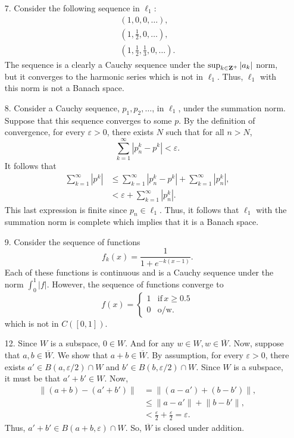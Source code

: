 \documentclass{article}
\newcommand{\eps}{\varepsilon}
\theoremstyle{remark}
\begin{document}
\thispagestyle{firstpage}
\begin{enumerate}[leftmargin=*]
    \item[7.] Consider the following sequence in $\ell_1$:
    \begin{gather*}
        \left(1,0,0,\ldots\right), \\
        \left(1,\frac{1}{2},0,\ldots\right), \\
        \left(1,\frac{1}{2},\frac{1}{3},0,\ldots\right).
    \end{gather*}
    The sequence is a clearly a Cauchy sequence under the $\sup_{k\in\mathbf{Z}^+}|a_k|$ norm, but it converges to the harmonic series which is not in $\ell_1$. Thus, $\ell_1$ with this norm is not a Banach space.
    \item[8.] Consider a Cauchy sequence, $p_1,p_2,\ldots$, in $\ell_1$, under the summation norm. Suppose that this sequence converges to some $p$. By the definition of convergence, for every $\eps > 0$, there exists $N$ such that for all $n > N$, \[
    \sum_{k=1}^\infty |p^k_n - p^k| < \eps.
    \]
    It follows that 
    \begin{align*}
        \sum_{k=1}^\infty |p^k| &\leq \sum_{k=1}^\infty |p^k_n - p^k| + \sum_{k=1}^\infty |p^k_n|, \\
        &< \eps + \sum_{k=1}^\infty |p^k_n|.
    \end{align*}
    This last expression is finite since $p_n \in \ell_1$. Thus, it follows that $\ell_1$ with the summation norm is complete which implies that it is a Banach space.
    \item[9.] Consider the sequence of functions \[
    f_k(x) = \frac{1}{1+e^{-k(x-1)}}.
    \]
    Each of these functions is continuous and is a Cauchy sequence under the norm $\int_0^1|f|$. However, the sequence of functions converge to 
    \[
        f(x) = \begin{cases}1 &\text{if}\,x\geq 0.5 \\ 0 &\text{o/w}.\end{cases}
    \]
    which is not in $C([0,1])$.
    \item[12.] Since $W$ is a subspace, $0 \in W$. And for any $w \in W, w \in \overline{W}$. Now, suppose that $a, b \in \overline{W}$. We show that $a + b \in \overline{W}$. By assumption, for every $\eps > 0$, there exists $a' \in B(a,\eps/2) \cap W$ and $b' \in B(b,\eps/2) \cap W$. Since $W$ is a subspace, it must be that $a' + b' \in W$. Now,
    \begin{align*}
        \lVert (a + b) - (a' + b') \rVert &= \lVert (a - a') + (b - b') \rVert, \\
        &\leq \lVert a - a'\rVert + \lVert b - b' \rVert, \\
        &< \frac{\eps}{2} + \frac{\eps}{2} = \eps.
    \end{align*}
    Thus, $a' + b' \in B(a + b, \eps) \cap W$. So, $\overline{W}$ is closed under addition. 


\end{enumerate}
\end{document}
